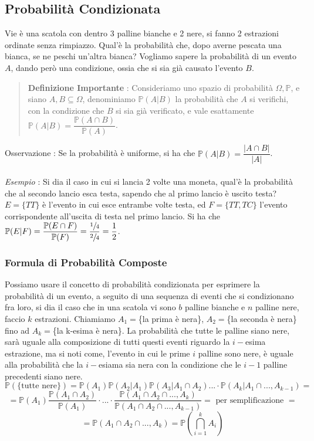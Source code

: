 \documentclass[12pt, letterpaper]{article}
\begin{document}
\subsection{Probabilità Condizionata}
Vie è una scatola con dentro 3 palline bianche e 2 nere, si fanno 2 estrazioni ordinate 
senza rimpiazzo. Qual'è la probabilità che, dopo averne pescata una bianca, se ne peschi un'altra bianca?
Vogliamo sapere la probabilità di un evento \(A\), dando però una condizione, ossia che 
si sia già causato l'evento \(B\). \begin{quote}\textbf{Definizione Importante} : 
    Consideriamo uno spazio di probabilità \(\Omega, \mathbb{P}\), e siano \(A,B\subseteq \Omega\), 
    denominiamo  \(\mathbb{P}(A|B)\) la probabilità che \(A\) si verifichi, con la condizione che 
    \(B\) si sia già verificato, e vale esattamente \(\mathbb{P}(A|B)=\dfrac{\mathbb{P}(A\cap B)}{\mathbb{P}(A)}\). 
\end{quote}
Osservazione : Se la probabilità è uniforme, si ha che  \(\mathbb{P}(A|B)=\dfrac{|A\cap B|}{|A|}\). \\
\hphantom{}\\\textit{Esempio} : Si dia il caso in cui si lancia 2 volte una moneta, qual'è la probabilità che al secondo lancio esca testa, 
sapendo che al primo lancio è uscito testa? \(E=\{TT\}\) è 
l'evento in cui esce entrambe volte testa, ed \(F=\{TT,TC\}\) l'evento corrispondente all'uscita 
di testa nel primo lancio. Si ha che \(\mathbb{P}(E|F)=\dfrac{\mathbb{P}(E\cap F)}{\mathbb{P}(F)}=\dfrac{\sfrac{1}{4}}{\sfrac{2}{4}}=\dfrac{1}{2}\).
\subsubsection{Formula di Probabilità Composte}
Possiamo usare il concetto di probabilità condizionata per esprimere la probabilità di un evento, a seguito 
di una sequenza di eventi che si condizionano fra loro, si dia il caso che in una scatola vi sono \(b\) 
palline bianche e \(n\) palline nere, faccio \(k\) estrazioni. Chiamiamo \(A_1=\)\{la prima è nera\}, 
\(A_2=\)\{la seconda è nera\} fino ad \(A_k=\)\{la k-esima è nera\}. La probabilità che tutte le palline siano 
nere, sarà uguale alla composizione di tutti questi eventi riguardo la \(i-\)esima estrazione, ma si noti come, 
l'evento in cui le prime \(i\) palline sono nere, è uguale alla probabilità che la \(i-\)esiama sia nera 
con la condizione che le \(i-1\) palline precedenti siano nere.\begin{equation}
    \mathbb{P}(\{\text{tutte nere}\})=\mathbb{P}(A_1)\mathbb{P}(A_2|A_1)\mathbb{P}(A_3|A_1\cap A_2)...\cdot\mathbb{P}(A_k|A_1\cap...,A_{k-1})=
\end{equation}\begin{equation}
    =\mathbb{P}(A_1)\dfrac{\mathbb{P}(A_1\cap A_2)}{\mathbb{P}(A_1)}\cdot...\cdot\dfrac{\mathbb{P}(A_1\cap A_2\cap...,A_{k})}{\mathbb{P}(A_1\cap A_2\cap...,A_{k-1})}=\text{ per semplificazione }=
\end{equation}
\begin{equation}
    =\mathbb{P}(A_1\cap A_2\cap...,A_{k})=\mathbb{P}(\bigcap_{i=1}^kA_i) 
\end{equation}
\end{document}
